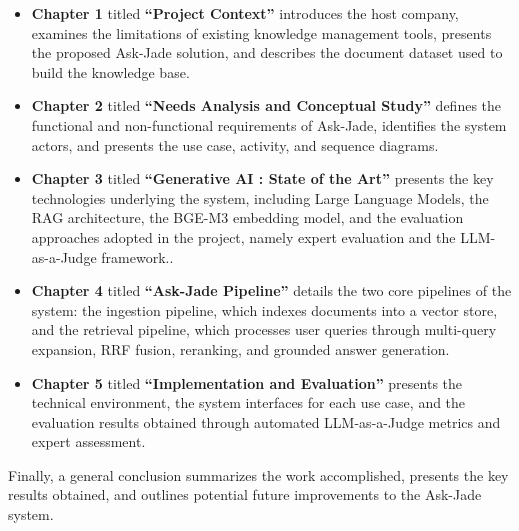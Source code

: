 \begin{itemize}

  \item \textbf{Chapter 1} titled \textbf{``Project Context''} introduces the host
        company, examines the limitations of existing knowledge management
        tools, presents the proposed Ask-Jade solution, and describes the
        document dataset used to build the knowledge base.

  \item \textbf{Chapter 2} titled \textbf{``Needs Analysis and Conceptual Study''}
        defines the functional and non-functional requirements of Ask-Jade,
        identifies the system actors, and presents the use case, activity,
        and sequence diagrams.

  \item \textbf{Chapter 3} titled \textbf{``Generative AI : State of the Art''}
        presents the key technologies underlying the system, including
        Large Language Models, the RAG architecture, the BGE-M3 embedding
        model, and the evaluation approaches adopted in the project,
        namely expert evaluation and the LLM-as-a-Judge framework..

  \item \textbf{Chapter 4} titled \textbf{``Ask-Jade Pipeline''} details the two
        core pipelines of the system: the ingestion pipeline, which indexes
        documents into a vector store, and the retrieval pipeline, which
        processes user queries through multi-query expansion, RRF fusion,
        reranking, and grounded answer generation.

  \item \textbf{Chapter 5} titled\textbf{ ``Implementation and Evaluation''}
        presents the technical environment, the system interfaces for each
        use case, and the evaluation results obtained through automated
        LLM-as-a-Judge metrics and expert assessment.

\end{itemize}

Finally, a general conclusion summarizes the work accomplished, presents
the key results obtained, and outlines potential future improvements
to the Ask-Jade system.
